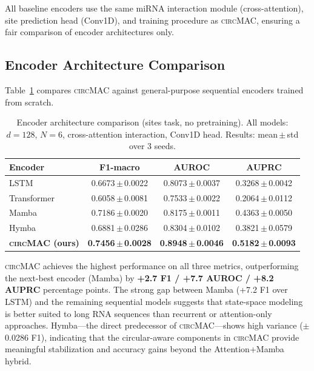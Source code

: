\documentclass[11pt]{article}
\newcommand{\model}{\textsc{circMAC}}
\newcommand{\best}[1]{\textbf{#1}}
\newcommand{\spm}{\,\ensuremath{\pm}\,}
\begin{document}
\noindent
All baseline encoders use the same miRNA interaction module (cross-attention),
site prediction head (Conv1D), and training procedure as \model{},
ensuring a fair comparison of encoder architectures only.


\subsection{Encoder Architecture Comparison}
\label{sec:encoder}

Table~\ref{tab:encoder} compares \model{} against general-purpose sequential
encoders trained from scratch.

\begin{table}[htbp]
\centering
\caption{Encoder architecture comparison (sites task, no pretraining).
         All models: $d{=}128$, $N{=}6$, cross-attention interaction, Conv1D head.
         Results: mean\,$\pm$\,std over 3 seeds.}
\label{tab:encoder}
\renewcommand{\arraystretch}{1.15}
\begin{tabular}{lccc}
\toprule
\textbf{Encoder} & \textbf{F1-macro} & \textbf{AUROC} & \textbf{AUPRC} \\
\midrule
LSTM             & 0.6673\spm 0.0022 & 0.8073\spm 0.0037 & 0.3268\spm 0.0042 \\
Transformer      & 0.6058\spm 0.0081 & 0.7533\spm 0.0022 & 0.2064\spm 0.0112 \\
Mamba            & 0.7186\spm 0.0020 & 0.8175\spm 0.0011 & 0.4363\spm 0.0050 \\
Hymba            & 0.6881\spm 0.0286 & 0.8304\spm 0.0102 & 0.3821\spm 0.0579 \\
\midrule
\textbf{\model{} (ours)} & \best{0.7456\spm 0.0028} & \best{0.8948\spm 0.0046} & \best{0.5182\spm 0.0093} \\
\bottomrule
\end{tabular}
\end{table}

\model{} achieves the highest performance on all three metrics, outperforming
the next-best encoder (Mamba) by \textbf{+2.7 F1 / +7.7 AUROC / +8.2 AUPRC}
percentage points.
The strong gap between Mamba (+7.2 F1 over LSTM) and the remaining sequential
models suggests that state-space modeling is better suited to long RNA
sequences than recurrent or attention-only approaches.
Hymba---the direct predecessor of \model{}---shows high variance
($\pm$0.0286 F1), indicating that the circular-aware components in \model{}
provide meaningful stabilization and accuracy gains beyond the
Attention+Mamba hybrid.
\end{document}
